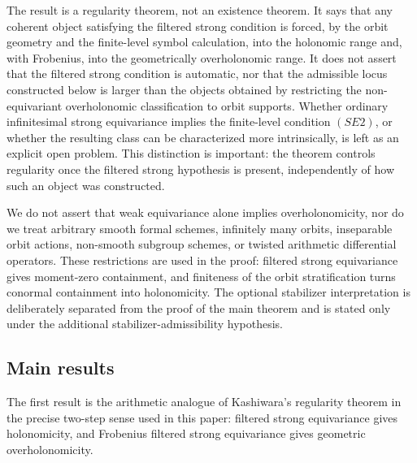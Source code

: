 \documentclass[11pt]{amsart}
\theoremstyle{plain}
\theoremstyle{definition}
\theoremstyle{remark}
\begin{document}
The result is a regularity theorem, not an existence theorem.  It says that any
coherent object satisfying the filtered strong condition is forced, by the
orbit geometry and the finite-level symbol calculation, into the holonomic range
and, with Frobenius, into the geometrically overholonomic range.  It does not
assert that the filtered strong condition is automatic, nor that the admissible
locus constructed below is larger than the objects obtained by restricting the
non-equivariant overholonomic classification to orbit supports.  Whether ordinary
infinitesimal strong equivariance implies the finite-level condition \((SE2)\),
or whether the resulting class can be characterized more intrinsically, is left
as an explicit open problem.  This distinction is important: the theorem controls
regularity once the filtered strong hypothesis is present, independently of how
such an object was constructed.

We do not assert that weak equivariance alone implies overholonomicity, nor do
we treat arbitrary smooth formal schemes, infinitely many orbits, inseparable
orbit actions, non-smooth subgroup schemes, or twisted arithmetic differential
operators.  These restrictions are used in the proof: filtered strong
equivariance gives moment-zero containment, and finiteness of the orbit
stratification turns conormal containment into holonomicity.  The optional
stabilizer interpretation is deliberately separated from the proof of the main
theorem and is stated only under the additional stabilizer-admissibility
hypothesis.

\subsection*{Main results}

The first result is the arithmetic analogue of Kashiwara's regularity theorem in
the precise two-step sense used in this paper: filtered strong equivariance gives
holonomicity, and Frobenius filtered strong equivariance gives geometric
overholonomicity.
\end{document}
